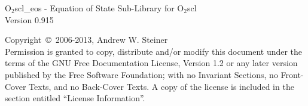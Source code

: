 \documentclass{article}
\begin{document}
\hypersetup{pageanchor=false,citecolor=blue}

\begin{titlepage}
\vspace*{7cm}
\begin{center}
{\huge O$_2$scl\_eos - Equation of State Sub-Library for O$_2$scl
\\[1ex]\large Version 0.915}\\
\end{center}
\vfill
Copyright~{\copyright}~2006-2013,
Andrew W. Steiner \\
Permission is granted to copy, distribute and/or modify this document
under the terms of the GNU Free Documentation License, Version 1.2 or
any later version published by the Free Software Foundation; with no
Invariant Sections, no Front-Cover Texts, and no Back-Cover Texts.  A
copy of the license is included in the section entitled ``License
Information''.
\end{titlepage}

\tableofcontents
{}
\hypersetup{pageanchor=true,citecolor=blue}
\end{document}
